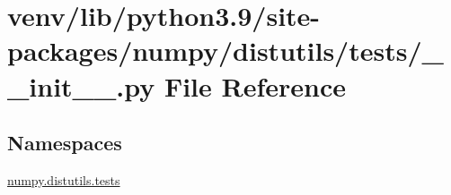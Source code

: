 \hypertarget{venv_2lib_2python3_89_2site-packages_2numpy_2distutils_2tests_2____init_____8py}{}\section{venv/lib/python3.9/site-\/packages/numpy/distutils/tests/\+\_\+\+\_\+init\+\_\+\+\_\+.py File Reference}
\label{venv_2lib_2python3_89_2site-packages_2numpy_2distutils_2tests_2____init_____8py}
\subsection*{Namespaces}
\begin{DoxyCompactItemize}
\item 
 \hyperlink{namespacenumpy_1_1distutils_1_1tests}{numpy.\+distutils.\+tests}
\end{DoxyCompactItemize}
